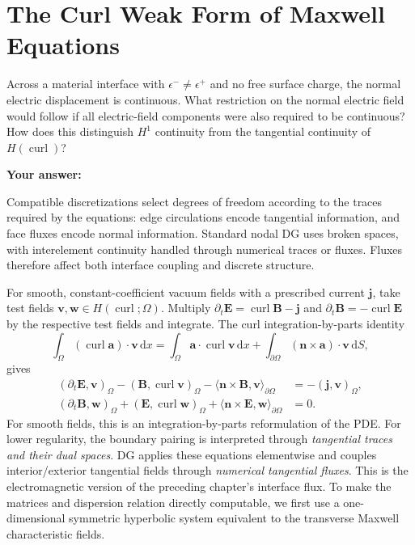 \documentclass[11pt,openany]{book}
\numberwithin{equation}{chapter}
\theoremstyle{definition}
\theoremstyle{remark}
\newcommand{\dd}{\mathrm d}
\newcommand{\curl}{\operatorname{curl}}
\begin{document}
\section{The Curl Weak Form of Maxwell Equations}\label{sec:maxwellweak}
\begin{studentinput}
Across a material interface with $\epsilon^-\ne\epsilon^+$ and no free surface charge, the normal electric displacement is continuous.
What restriction on the normal electric field would follow if all electric-field components were also required to be continuous?
How does this distinguish $H^1$ continuity from the tangential continuity of $H(\curl)$?

\textbf{Your answer:}\vspace{2cm}
\end{studentinput}

\begin{engineernote}
Compatible discretizations select degrees of freedom according to the traces required by the equations:
edge circulations encode tangential information, and face fluxes encode normal information.
Standard nodal DG uses broken spaces, with interelement continuity handled through numerical traces or fluxes.
Fluxes therefore affect both interface coupling and discrete structure.
\end{engineernote}
For smooth, constant-coefficient vacuum fields with a prescribed current $\bm j$,
take test fields $\bm v,\bm w\in H(\curl;\Omega)$.
Multiply $\partial_t\bm E=\curl\bm B-\bm j$ and
$\partial_t\bm B=-\curl\bm E$ by the respective test fields and integrate.
The curl integration-by-parts identity
\begin{equation}
\int_\Omega(\curl\bm a)\cdot\bm v\,\dd x
=\int_\Omega\bm a\cdot\curl\bm v\,\dd x
+\int_{\partial\Omega}(\bm n\times\bm a)\cdot\bm v\,\dd S,
\end{equation}
gives
\begin{align}\label{eq:maxwellweakcurl}
(\partial_t\bm E,\bm v)_\Omega
-(\bm B,\curl\bm v)_\Omega
-\langle\bm n\times\bm B,\bm v\rangle_{\partial\Omega}
&=-(\bm j,\bm v)_\Omega,\\
(\partial_t\bm B,\bm w)_\Omega
+(\bm E,\curl\bm w)_\Omega
+\langle\bm n\times\bm E,\bm w\rangle_{\partial\Omega}
&=0.
\end{align}
For smooth fields, this is an integration-by-parts reformulation of the PDE.
For lower regularity, the boundary pairing is interpreted through \emph{tangential traces and their dual spaces}.
DG applies these equations elementwise and couples interior/exterior tangential fields through \emph{numerical tangential fluxes}.
This is the electromagnetic version of the preceding chapter's interface flux.
To make the matrices and dispersion relation directly computable, we first use a one-dimensional symmetric hyperbolic system equivalent to the transverse Maxwell characteristic fields.
\end{document}
